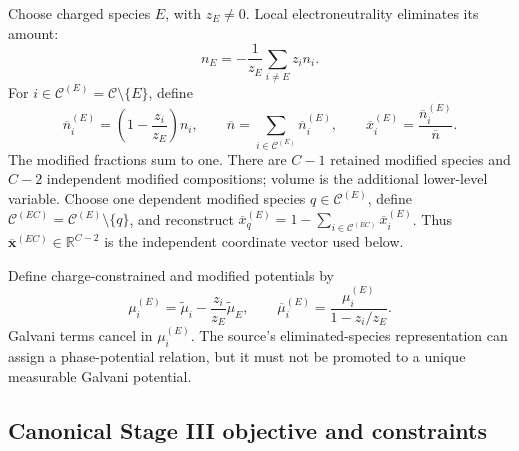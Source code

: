 \documentclass[11pt]{article}
\newcommand{\R}{\mathbb{R}}
\begin{document}
Choose charged species \(E\), with \(z_E\neq0\). Local electroneutrality
eliminates its amount:
\begin{equation}
 n_E=-\frac{1}{z_E}\sum_{i\neq E}z_i n_i.
\label{eq:eqform:perdomo-elimination}
\end{equation}
For \(i\in\mathcal C^{(E)}=\mathcal C\setminus\{E\}\), define
\begin{equation}
 \overline n_i^{(E)}
 =\left(1-\frac{z_i}{z_E}\right)n_i,\qquad
 \overline n=\sum_{i\in\mathcal C^{(E)}}\overline n_i^{(E)},\qquad
 \overline x_i^{(E)}=\frac{\overline n_i^{(E)}}{\overline n}.
\label{eq:eqform:perdomo-modified-moles}
\end{equation}
The modified fractions sum to one. There are \(C-1\) retained modified species
and \(C-2\) independent modified compositions; volume is the additional
lower-level variable. Choose one dependent modified species \(q\in
\mathcal C^{(E)}\), define
\(\mathcal C^{(EC)}=\mathcal C^{(E)}\setminus\{q\}\), and reconstruct
\(\overline x_q^{(E)}=1-\sum_{i\in\mathcal C^{(EC)}}
\overline x_i^{(E)}\). Thus
\(\overline{\boldsymbol x}^{(EC)}\in\R^{C-2}\) is the independent coordinate
vector used below.

Define charge-constrained and modified potentials by
\begin{equation}
 \mu_i^{(E)}
 =\widetilde\mu_i-\frac{z_i}{z_E}\widetilde\mu_E,\qquad
 \overline\mu_i^{(E)}
 =\frac{\mu_i^{(E)}}{1-z_i/z_E}.
\label{eq:eqform:perdomo-modified-potential}
\end{equation}
Galvani terms cancel in \(\mu_i^{(E)}\). The source's eliminated-species
representation can assign a phase-potential relation, but it must not be
promoted to a unique measurable Galvani potential.

\subsection{Canonical Stage III objective and constraints}
\end{document}
